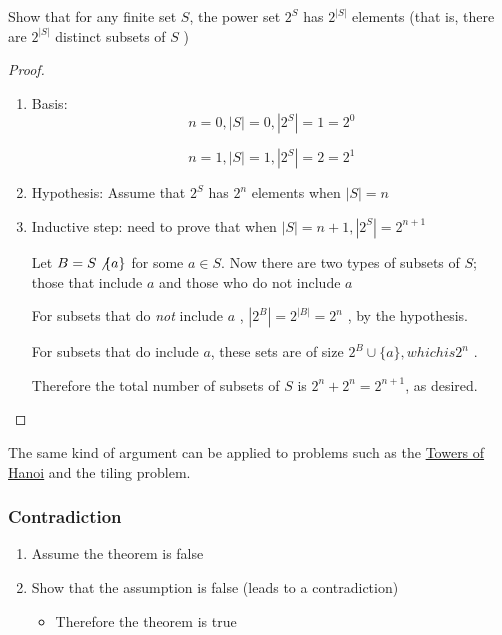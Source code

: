 \documentclass[../notes.tex]{subfiles}
\begin{document}
\begin{example}
	Show that for any finite set $ S $, the power set $ 2^S $ has $ 2^{|S|} $ elements (that is, there are $ 2^{|S|} $ distinct subsets of $ S $  )

	\begin{proof}

		\begin{enumerate}
			\item Basis: 
				\begin{equation}
				n = 0, |S| = 0, |2^S| = 1 = 2^0 
				\end{equation}

				\begin{equation}
					n = 1, |S| = 1, |2^S| = 2 = 2^1
				\end{equation}
			\item Hypothesis: Assume that $ 2^S $ has $ 2^n $ elements when $ |S| = n $ 
			\item Inductive step: need to prove that when $ |S| = n+1, |2^S| = 2^{n+1} $ 

				Let $ B = S  \not \{a\}  $ for some $ a \in S $. 
				Now there are two types of subsets of $ S $; those that include $ a $ and those who do not include $ a $ 

				For subsets that do \textit{not} include  $ a $ , $ |2^{B}| = 2^{|B|} = 2^n $ , by the hypothesis.

				For subsets that do include $ a $, these sets are of size $ 2^B \cup \{a\}, which is  2^n  $ .

				Therefore the total number of subsets of $ S $ is $ 2^n + 2^n = 2^{n+1} $, as desired.
		\end{enumerate}
	\end{proof}
	
\end{example}

The same kind of argument can be applied to problems such as the \href{https://en.wikipedia.org/wiki/Tower_of_Hanoi}{Towers of Hanoi} and the tiling problem.


\subsubsection{Contradiction}
\begin{enumerate}
	\item Assume the theorem is false
	\item Show that the assumption is false (leads to a contradiction)
		\begin{itemize}
	\item Therefore the theorem is true
		\end{itemize}
\end{enumerate}
\end{document}
